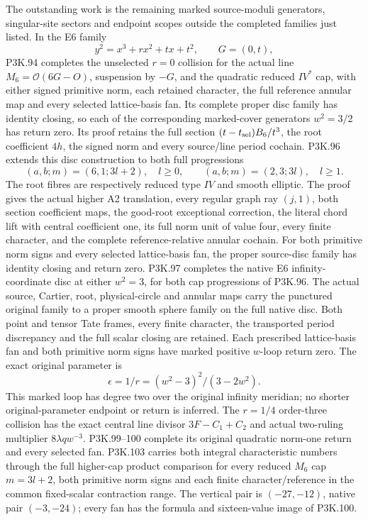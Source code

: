 \begin{theorem}
The outstanding work is the remaining marked source-moduli
generators, singular-site sectors and endpoint scopes outside
the completed families just listed. In the E6 family
\[
 y^2=x^3+rx^2+tx+t^2,\qquad G=(0,t),
\]
P3K.94 completes the unselected \(r=0\) collision for the actual
line \(M_6=\mathcal O(6G-O)\), suspension by \(-G\), and the
quadratic reduced \(IV^*\) cap, with either signed primitive norm,
each retained character, the full reference annular map and every
selected lattice-basis fan. Its complete proper disc family has
identity closing, so each of the corresponding marked-cover
generators \(w^2=3/2\) has return zero. Its proof retains the full
section \((t-t_{\rm sel})B_6/t^3\), the root coefficient \(4h\),
the signed norm and every source/line period cochain.
P3K.96 extends this disc construction to both full progressions
\[
 (a,b;m)=(6,1;3l+2),\quad l\ge0,
 \qquad (a,b;m)=(2,3;3l),\quad l\ge1.
\]
The root fibres are respectively reduced type \(IV\) and smooth
elliptic. The proof gives the actual higher A2 translation, every
regular graph ray \((j,1)\), both section coefficient maps, the
good-root exceptional correction, the literal chord lift with central
coefficient one, its full norm unit of value four, every finite
character, and the complete reference-relative annular cochain.
For both primitive norm signs and every selected lattice-basis fan,
the proper source-disc family has identity closing and return zero.
P3K.97 completes the native E6 infinity-coordinate disc at either
\(w^2=3\), for both cap progressions of P3K.96. The actual source,
Cartier, root, physical-circle and annular maps carry the punctured
original family to a proper smooth sphere family on the full native
disc. Both point and tensor Tate frames, every finite character,
the transported period discrepancy and the full scalar closing are
retained. Each prescribed lattice-basis fan and both primitive norm
signs have marked positive \(w\)-loop return zero. The exact original
parameter is
\[
 \epsilon=1/r=(w^2-3)^2/(3-2w^2).
\]
This marked loop has degree two over the original infinity meridian;
no shorter original-parameter endpoint or return is inferred.
The \(r=1/4\) order-three collision has the exact central line
divisor \(3F-C_1+C_2\) and actual two-ruling multiplier
\(8\lambda q w^{-3}\). P3K.99--100 complete its original
quadratic norm-one return and every selected fan. P3K.103 carries
both integral characteristic numbers through the full higher-cap
product comparison for every reduced \(M_6\) cap \(m=3l+2\),
both primitive norm signs and each finite character/reference in
the common fixed-scalar contraction range. The vertical pair is
\((-27,-12)\), native pair \((-3,-24)\); every fan has the
formula and sixteen-value image of P3K.100.


\end{theorem}
